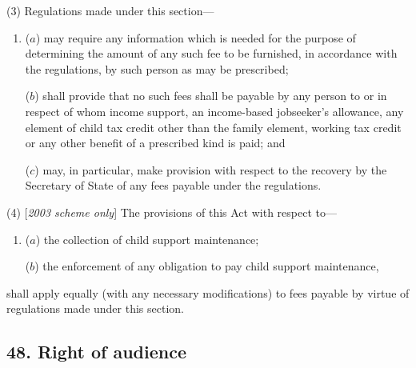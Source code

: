 \documentclass[12pt,a4paper]{article}
\begin{document}
(3) Regulations made under this section—
\begin{enumerate}\item[]
($a$) may require any information which is needed for the purpose of determining the amount of any such fee to be furnished, in accordance with the regulations, by such person as may be prescribed;

($b$) shall provide that no such fees shall be payable by any person to or in respect of whom income support, 
an income-based jobseeker’s allowance,  %
any element of child tax credit other than the family element, working tax credit  %
or any other benefit of a prescribed kind is paid; and

($c$) may, in particular, make provision with respect to the recovery by the Secretary of State of any fees payable under the regulations.
\end{enumerate}

(4) [\emph{2003 scheme only}] The provisions of this Act with respect to—
\begin{enumerate}\item[]
($a$) the collection of child support maintenance;

($b$) the enforcement of any obligation to pay child support maintenance,
\end{enumerate}
shall apply equally (with any necessary modifications) to fees payable by virtue of regulations made under this section.


\subsection{48. Right of audience}
\end{document}
